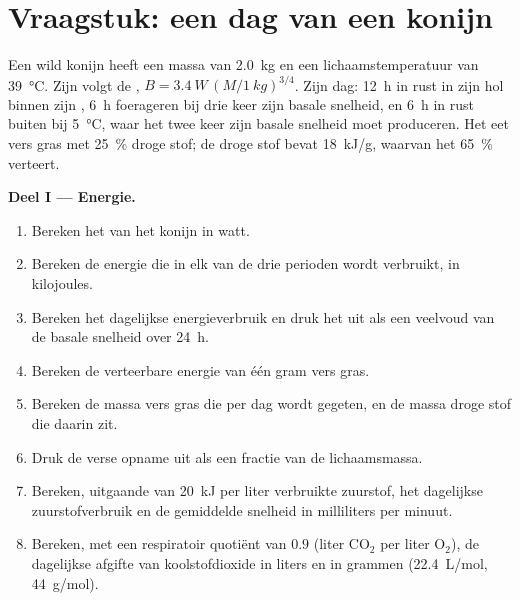 \section{Vraagstuk: een dag van een konijn}

\begin{problem}
\label{pb:b1:mammal-organization:1}
Een wild konijn heeft een massa van \qty{2.0}{kg} en een lichaamstemperatuur
van \qty{39}{\celsius}. Zijn  volgt de ,
$B = \qty{3.4}{W}\,(M/\qty{1}{kg})^{3/4}$. Zijn dag: \qty{12}{h} in rust in
zijn hol binnen zijn , \qty{6}{h} foerageren bij drie keer
zijn basale snelheid, en \qty{6}{h} in rust buiten bij \qty{5}{\celsius}, waar
het twee keer zijn basale snelheid moet produceren. Het eet vers gras met
\qty{25}{\%} droge stof; de droge stof bevat \qty{18}{kJ/g}, waarvan het
\qty{65}{\%} verteert.

\medskip
\noindent\textbf{Deel I --- Energie.}
\begin{enumerate}
  \item Bereken het  van het konijn in watt.
  \item Bereken de energie die in elk van de drie perioden wordt
        verbruikt, in kilojoules.
  \item Bereken het dagelijkse energieverbruik en druk het uit als een
        veelvoud van de basale snelheid over \qty{24}{h}.
  \item Bereken de verteerbare energie van één gram vers gras.
  \item Bereken de massa vers gras die per dag wordt gegeten, en de massa
        droge stof die daarin zit.
  \item Druk de verse opname uit als een fractie van de lichaamsmassa.
  \item Bereken, uitgaande van \qty{20}{kJ} per liter verbruikte zuurstof,
        het dagelijkse zuurstofverbruik en de gemiddelde snelheid in
        milliliters per minuut.
  \item Bereken, met een respiratoir quotiënt van $0.9$ (liter
        $\mathrm{CO_2}$ per liter $\mathrm{O_2}$), de dagelijkse afgifte
        van koolstofdioxide in liters en in grammen (\qty{22.4}{L/mol},
        \qty{44}{g/mol}).
\end{enumerate}


\end{problem}
